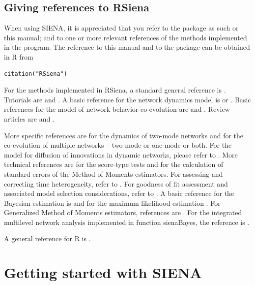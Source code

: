 \documentclass[a4paper,fleqn,11pt]{article}
\newcommand{\+}{\, + \,}
\newcommand{\sfn}[1]{\textsf{#1}}
\newcommand{\R}{{\sf R }}
\newcommand{\rs}{{\sf RSiena}}
\newcommand{\SI}{{\sf SIENA }}
\newcommand{\si}{{\sf SIENA}}
\begin{document}
\newpage

\subsection{Giving references to RSiena}

When using \si, it is appreciated that you refer to the package as such
or this manual; and to one or
more relevant references of the methods implemented in the program.  The
reference to this manual and to the package can be obtained in \R from
\begin{verbatim}
citation("RSiena")
\end{verbatim}

For the methods implemented in \rs,
a standard general reference is \citet{Snijders2017}.
Tutorials are \citet*{SnijdersEA10b} and \citet{Kalish2020}.
A basic reference for the network dynamics model is \citet{Snijders01}
or \citet{Snijders05}.
Basic references for the model of network-behavior co-evolution
are \citet*{SnijdersEA07} and \citet*{SteglichEA10}.
Review articles are \citet{Snijders2017} and \citet{SnijdersPickup16}.

More specific references are \citet{KoskinenEdling2012} for the
dynamics of two-mode networks and \citet{SLT2013} for the
co-evolution of multiple networks -- two mode or one-mode or both.
For the model for diffusion of innovations in dynamic networks,
please refer to \citet{Greenan15}.
More technical references are
\citet{Schweinberger12} for the score-type tests
and \citet{SchweinbergerSnijders07a} for the calculation of
standard errors of the Method of Moments estimators.
For assessing and correcting time heterogeneity, refer to
\citet*{Lospinoso2011}.
For goodness of fit assessment and associated model
selection considerations, refer to \citet{LospinosoSnijders2019}.
A basic reference for the Bayesian estimation is \citet{KoskinenSnijders07}
and for the maximum likelihood estimation \citet*{SnijdersEA10a}.
For Generalized Method of Moments estimators,
references are \citet*{ASS2015,ASS2019}.
For the integrated multilevel network analysis implemented
in function \sfn{sienaBayes}, the reference is \citet{KoskinenSnijders2023}.
\smallskip

A general reference for \R is \citet{R}.


\newpage

\section{Getting started with \SI}
\label{S_minsi1}
\end{document}
